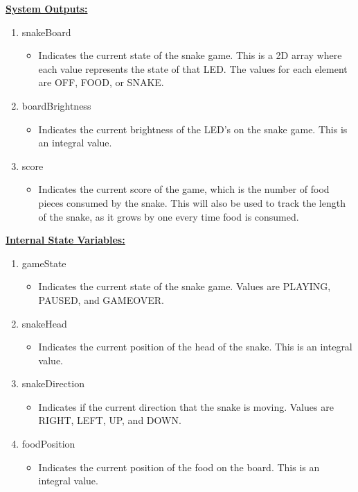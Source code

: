 \documentclass[11pt]{article}
\newcommand{\linespace} {\vspace{\baselineskip}}
\begin{document}
    \noindent \textbf{\underline{System Outputs:}}
    \begin{enumerate}
        \item snakeBoard
        \begin{itemize}[nolistsep, noitemsep, label=--]
            \item Indicates the current state of the snake game. This is a 2D array where each value represents
            the state of that LED. The values for each element are OFF, FOOD, or SNAKE.
        \end{itemize}
        \item boardBrightness
        \begin{itemize}[nolistsep, noitemsep, label=--]
            \item Indicates the current brightness of the LED's on the snake game. This is an integral value.
        \end{itemize}
        \item score
        \begin{itemize}[nolistsep, noitemsep, label=--]
            \item Indicates the current score of the game, which is the number of food pieces consumed by the snake.
            This will also be used to track the length of the snake, as it grows by one every time food is consumed.
        \end{itemize}         
    \end{enumerate} \linespace

    \noindent \textbf{\underline{Internal State Variables:}}
    \begin{enumerate}[noitemsep]
        \item gameState
        \begin{itemize}[nolistsep, noitemsep, label=--]
            \item Indicates the current state of the snake game. Values are PLAYING, PAUSED, and GAMEOVER.
        \end{itemize}
        \item snakeHead
        \begin{itemize}[nolistsep, noitemsep, label=--]
            \item Indicates the current position of the head of the snake. This is an integral value.
        \end{itemize}
        \item snakeDirection
        \begin{itemize}[nolistsep, noitemsep, label=--]
            \item Indicates if the current direction that the snake is moving. Values are RIGHT, LEFT, UP, and DOWN.
        \end{itemize}
        \item foodPosition
        \begin{itemize}[nolistsep, noitemsep, label=--]
            \item Indicates the current position of the food on the board. This is an integral value.
        \end{itemize}           
    \end{enumerate}
\end{document}
